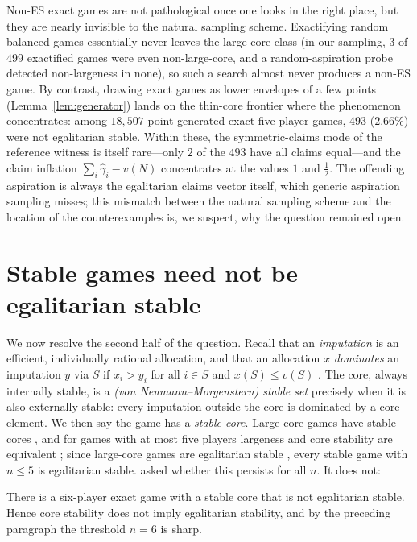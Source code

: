 \begin{remark}\label{rem:frequency}
Non-ES exact games are not pathological once one looks in the right place, but
they are nearly invisible to the natural sampling scheme. Exactifying random
balanced games essentially never leaves the large-core class (in our sampling,
$3$ of $499$ exactified games were even non-large-core, and a random-aspiration
probe detected non-largeness in none), so such a search almost never produces a
non-ES game. By contrast, drawing exact games as lower envelopes of a few points
(Lemma~\ref{lem:generator}) lands on the thin-core frontier where the phenomenon
concentrates: among $18{,}507$ point-generated exact five-player games, $493$
($2.66\%$) were not egalitarian stable. Within these, the symmetric-claims mode of
the reference witness is itself rare---only $2$ of the $493$ have all claims
equal---and the claim inflation $\sum_i\widehat\gamma_i-v(N)$ concentrates at the
values $1$ and $\tfrac12$. The offending aspiration is always the egalitarian
claims vector itself, which generic aspiration sampling misses; this mismatch
between the natural sampling scheme and the location of the counterexamples is, we
suspect, why the question remained open.
\end{remark}

\section{Stable games need not be egalitarian stable}\label{sec:stable}

We now resolve the second half of the question. Recall that an
\emph{imputation} is an efficient, individually rational allocation, and that an
allocation $x$ \emph{dominates} an imputation $y$ via $S$ if $x_i>y_i$ for all
$i\in S$ and $x(S)\le v(S)$ \citep{vNM1944}. The core, always internally
stable, is a \emph{(von Neumann--Morgenstern) stable set} precisely when it is
also externally stable: every imputation outside the core is dominated by a
core element. We then say the game has a \emph{stable core}. Large-core games
have stable cores \citep{Sharkey1982}, and for games with at most five players
largeness and core stability are equivalent \citep[Sec.~5]{Estevez2012}; since
large-core games are egalitarian stable \citep{Dietzenbacher2021}, every stable
game with $n\le5$ is egalitarian stable. \citet{Dietzenbacher2021} asked
whether this persists for all $n$. It does not:

\begin{theorem}\label{thm:stable}
There is a six-player exact game with a stable core that is not egalitarian
stable. Hence core stability does not imply egalitarian stability, and by the
preceding paragraph the threshold $n=6$ is sharp.
\end{theorem}

